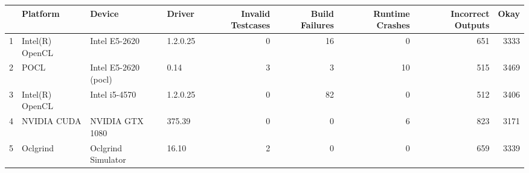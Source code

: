 \begin{tabular}{llllrrrrr}
\toprule
{} &         Platform &                Device &    Driver &  Invalid Testcases &  Build Failures &  Runtime Crashes &  Incorrect Outputs &  Okay \\
\midrule
1 &  Intel(R) OpenCL &         Intel E5-2620 &  1.2.0.25 &                  0 &              16 &                0 &                651 &  3333 \\
2 &             POCL &  Intel E5-2620 (pocl) &      0.14 &                  3 &               3 &               10 &                515 &  3469 \\
3 &  Intel(R) OpenCL &         Intel i5-4570 &  1.2.0.25 &                  0 &              82 &                0 &                512 &  3406 \\
4 &      NVIDIA CUDA &       NVIDIA GTX 1080 &    375.39 &                  0 &               0 &                6 &                823 &  3171 \\
5 &         Oclgrind &    Oclgrind Simulator &     16.10 &                  2 &               0 &                0 &                659 &  3339 \\
\bottomrule
\end{tabular}
